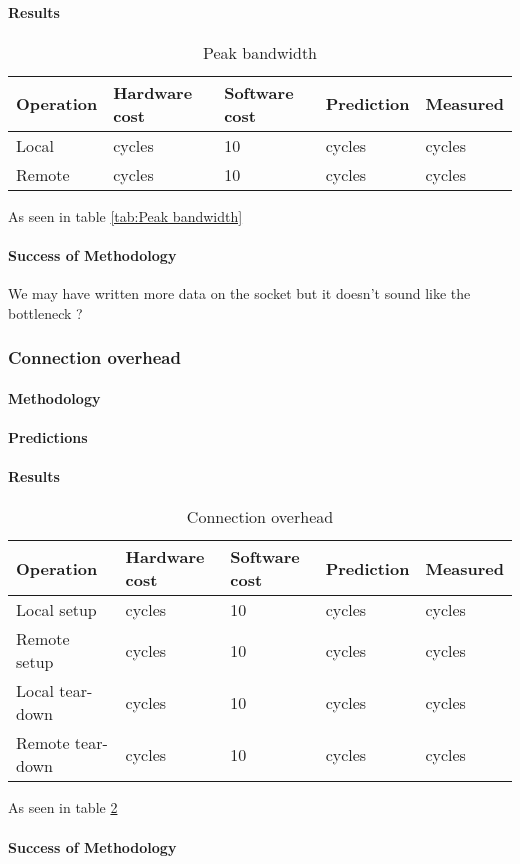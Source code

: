 \paragraph{Results}
\begin{table}[h]
\begin{center}
\begin{tabular}{| l | l | l | l | l |}
\hline
Operation & Hardware cost & Software cost & Prediction & Measured \\
\hline
Local 	&  cycles		& 10			&  cycles	&  cycles \\
\hline
Remote 	&  cycles		& 10			&  cycles	&  cycles \\
\hline

\end{tabular}
\end{center}
\caption{Peak bandwidth\label{tab:peak-bandwidth}}
\end{table}

As seen in table \ref{tab:Peak bandwidth}
\paragraph{Success of Methodology}
We may have written more data on the socket but it doesn't sound like the
bottleneck ?




\subsubsection{Connection overhead}
\paragraph{Methodology}
\paragraph{Predictions}
\paragraph{Results}
\begin{table} [h]
\begin{center}
\begin{tabular}{| l | l | l | l | l |}
\hline
Operation & Hardware cost & Software cost & Prediction & Measured \\
\hline

Local setup 	&  cycles		& 10			&  cycles	&  cycles \\
\hline
Remote setup	&  cycles		& 10			&  cycles	&  cycles \\
\hline
Local tear-down 	&  cycles		& 10			&  cycles	&  cycles \\
\hline
Remote tear-down	&  cycles		& 10			&  cycles	&  cycles \\
\hline


\end{tabular}
\end{center}
\caption{Connection overhead\label{tab:connection-overhead}}
\end{table}

As seen in table \ref{tab:connection-overhead}

\paragraph{Success of Methodology}
